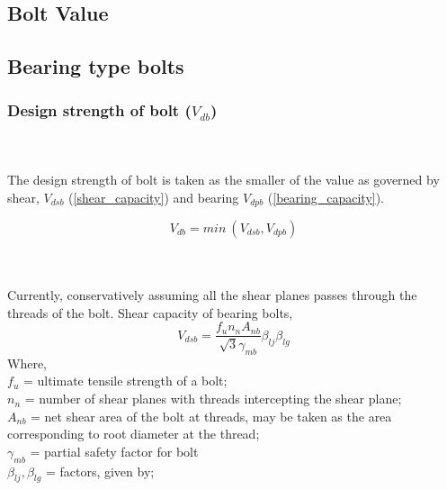 \documentclass[11.5pt,a4paper,oneside]{report}
\newcounter{subsubsubsection}[subsubsection]
\begin{document}
\begin{Form}
\section{Bolt Value}
\subsection{Bearing type bolts}

\subsubsection{Design strength of bolt (\boldmath $V_{db}$)}
\qquad \qquad [Reference: Cl. 10.3.2, IS 800:2007] \\ \\ 

\noindent The design strength of bolt is taken as the smaller of the value as governed by shear, $V_{dsb}$ (\ref{shear_capacity}) and bearing $V_{dpb}$ (\ref{bearing_capacity}).

\begin{equation}
	V_{db} = min~ (V_{dsb}, V_{dpb})
\end{equation}

\label{shear_capacity}
\qquad \qquad [Reference: Cl. 10.3.3, IS 800:2007] \\ \\
Currently, conservatively assuming all the shear planes passes through the threads of the bolt. Shear capacity of bearing bolts,
\begin{equation}
	V_{dsb} = \frac{f_u n_n A_{nb}}{\sqrt{3} \gamma_{mb}} \beta_{lj} \beta_{lg} 
\end{equation}
Where, \\
\indent $f_u$ = ultimate tensile strength of a bolt;\\
\indent $n_n$ =  number of shear planes with threads intercepting the shear plane; \\
\indent $A_{nb}$ = net shear area of the bolt at threads, may be taken as the area corresponding to root diameter at the thread;\\
\indent $\gamma_{mb}$ = partial safety factor for bolt\\
\indent $\beta_{lj}, \beta_{lg}$ = factors, given by;


\end{Form}
\end{document}
